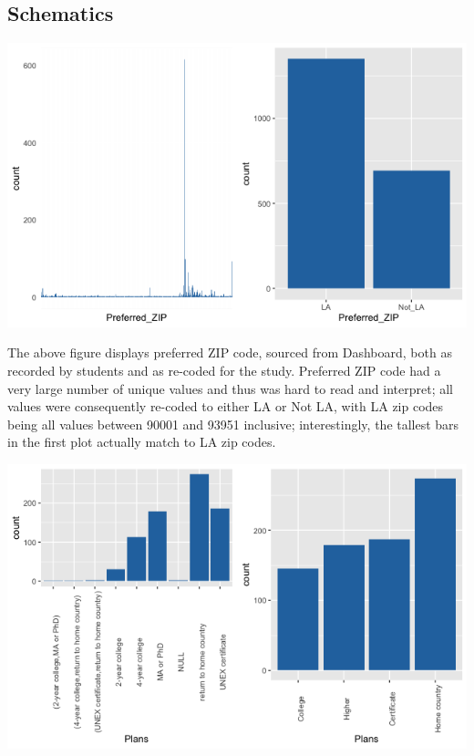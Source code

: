 \documentclass[12pt,letterpaper]{article}
\begin{document}
\subsection{Schematics}

\begin{center}
    \includegraphics[scale = 0.5]{Plots/schematic1.png}
\end{center}

The above figure displays preferred ZIP code, sourced from Dashboard, both as recorded by students and as re-coded for the study. Preferred ZIP code had a very large number of unique values and thus was hard to read and interpret; all values were consequently re-coded to either LA or Not LA, with LA zip codes being all values between 90001 and 93951 inclusive; interestingly, the tallest bars in the first plot actually match to LA zip codes.

\begin{center}
    \includegraphics[scale = 0.5]{Plots/schematic2.png}
\end{center}
\end{document}
